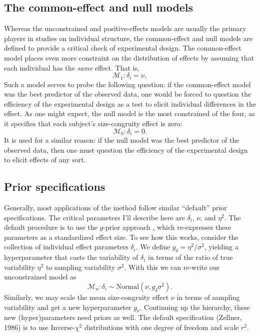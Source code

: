 \documentclass[12pt,twoside,a4paper]{article}
\begin{document}
\subsection{The common-effect and null models}

Whereas the unconstrained and positive-effects models are usually the primary players in studies on individual structure, the common-effect and null models are defined to provide a critical check of experimental design. The common-effect model places even more constraint on the distribution of effects by assuming that each individual has the \emph{same} effect. That is,
\[
\mathcal{M}_1:\delta_i = \nu,
\]
Such a model serves to probe the following question: if the common-effect model was the best predictor of the observed data, one would be forced to question the efficiency of the experimental design as a test to elicit individual differences in the effect. As one might expect, the null model is the most constrained of the four, as it specifies that each subject's size-congruity effect is zero:
\[
\mathcal{M}_0:\delta_i = 0.
\]
It is used for a similar reason: if the null model was the best predictor of the observed data, then one must question the efficiency of the experimental design to elicit effects of any sort.

\subsection{Prior specifications}

Generally, most applications of the \citet{haaf2017} method follow similar ``default'' prior specifications. The critical parameters I'll describe here are \(\delta_i\), \(\nu\), and \(\eta^2\). The default procedure is to use the \(g\)-prior approach \citep{rouder2012,zellner1986}, which re-expresses these parameters as a standardized effect size. To see how this works, consider the collection of individual effect parameters \(\delta_i\). We define \(g_{\delta} = \eta^2/\sigma^2\), yielding a hyperparameter that casts the variability of \(\delta_i\) in terms of the ratio of true variability \(\eta^2\) to sampling variability \(\sigma^2\). With this we can re-write our unconstrained model as
\[
\mathcal{M}_u:\delta_i \sim \text{Normal}(\nu, g_{\delta}\sigma^2).
\]
Similarly, we may scale the mean size-congruity effect \(\nu\) in terms of sampling variability and get a new hyperparameter \(g_{\nu}\). Continuing up the hierarchy, these new (hyper)parameters need priors as well. The default specification (Zellner, 1986) is to use \(\text{Inverse-}\chi^2\) distributions with one degree of freedom and scale \(r^2\).\\
\end{document}

